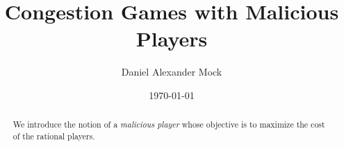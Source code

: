 \documentclass[a4paper]{tufte-handout}
\title{Congestion Games with Malicious Players}
\author{Daniel Alexander Mock}
\date{\today}
\begin{document}
	\maketitle
	
	\begin{abstract}
		We introduce the notion of a \emph{malicious player} whose objective is to maximize the cost of the rational players.
	\end{abstract}










\end{document}
